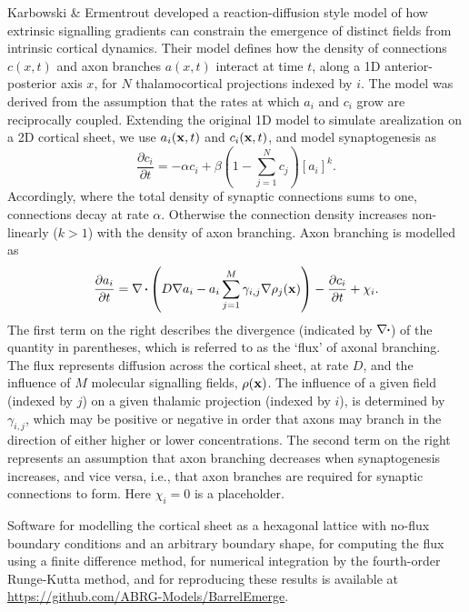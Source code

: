\documentclass[9pt,twocolumn,twoside,lineno]{pnas-new}
\begin{document}
Karbowski \& Ermentrout \citep{karbowski_model_2004} developed a reaction-diffusion style model of how extrinsic signalling gradients can constrain the emergence of distinct fields from intrinsic cortical dynamics. Their model defines how the density of connections $c(x,t)$ and axon branches $a(x,t)$ interact at time $t$, along a 1D anterior-posterior axis $x$, for $N$ thalamocortical projections indexed by $i$. The model was derived from the assumption that the rates at which $a_i$ and $c_i$ grow are reciprocally coupled. Extending the original 1D model to simulate arealization on a 2D cortical sheet, we use $a_i(\mathbf{x},t)$ and $c_i(\mathbf{x},t)$, and  model synaptogenesis as
%
\begin{equation} \label{eq:dc}
\frac{\partial c_i}{\partial t} =-\alpha c_i +\beta  \left(1 - \sum_{j=1}^{N} c_{j}\right)[a_i]^k.
\end{equation}
%
Accordingly, where the total density of synaptic connections sums to one, connections decay at rate $\alpha$. Otherwise the connection density increases non-linearly ($k>1$) with the density of axon branching. Axon branching is modelled as
%
\begin{equation} \label{eq:da}
\frac{\partial a_i}{\partial t} = \nabla\vcdot\left(D \nabla a_i-a_i\sum_{j=1}^{M} \gamma_{i,j}\nabla \rho_j(\mb{x})\right) - \frac{\partial c_i}{\partial t} + \chi_i.
\end{equation}
%
The first term on the right describes the divergence (indicated by $\nabla\vcdot$) of the quantity in parentheses, which is referred to as the `flux' of axonal branching. The flux represents diffusion across the cortical sheet, at rate $D$, and the influence of $M$ molecular signalling fields, $\rho(\mathbf{x})$. The influence of a given field (indexed by $j$) on a given thalamic projection (indexed by $i$), is determined by $\gamma_{i,j}$, which may be positive or negative in order that axons may branch in the direction of either higher or lower  concentrations. The second term on the right represents an assumption that axon branching decreases when synaptogenesis increases, and vice versa, i.e., that axon branches are required for synaptic connections to form. Here $\chi_i=0$ is a placeholder.

Software for modelling the cortical sheet as a hexagonal lattice with no-flux
boundary conditions and an arbitrary boundary shape, for computing the flux
using a finite difference method, for numerical integration by the
fourth-order Runge-Kutta method, and for reproducing these results is available at \url{https://github.com/ABRG-Models/BarrelEmerge}.
\end{document}

